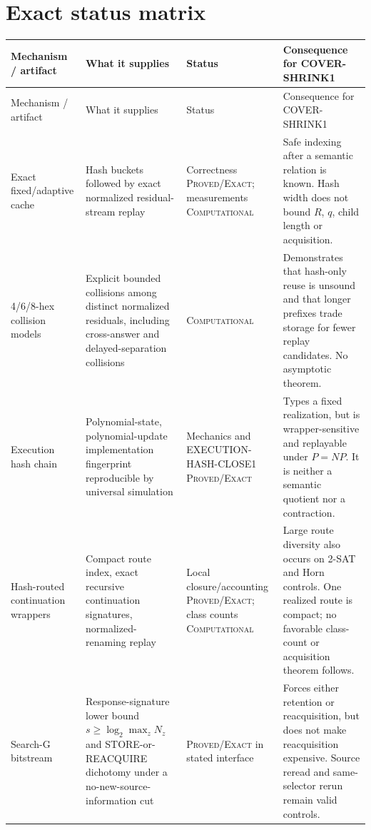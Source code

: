 \documentclass[11pt]{article}
\newcommand{\Exact}{\textsc{Proved/Exact}}
\newcommand{\Comp}{\textsc{Computational}}
\begin{document}
\section{Exact status matrix}

\footnotesize
\begin{longtable}{L{0.16\textwidth}L{0.22\textwidth}L{0.17\textwidth}L{0.33\textwidth}}
\toprule
Mechanism / artifact & What it supplies & Status & Consequence for COVER-SHRINK1 \\
\midrule
\endfirsthead
\toprule
Mechanism / artifact & What it supplies & Status & Consequence for COVER-SHRINK1 \\
\midrule
\endhead
\bottomrule
\endfoot

Exact fixed/adaptive cache & Hash buckets followed by exact normalized residual-stream replay & Correctness \Exact; measurements \Comp & Safe indexing after a semantic relation is known.  Hash width does not bound $R$, $q$, child length or acquisition. \\

4/6/8-hex collision models & Explicit bounded collisions among distinct normalized residuals, including cross-answer and delayed-separation collisions & \Comp & Demonstrates that hash-only reuse is unsound and that longer prefixes trade storage for fewer replay candidates.  No asymptotic theorem. \\

Execution hash chain & Polynomial-state, polynomial-update implementation fingerprint reproducible by universal simulation & Mechanics and EXECUTION-HASH-CLOSE1 \Exact & Types a fixed realization, but is wrapper-sensitive and replayable under $P=NP$.  It is neither a semantic quotient nor a contraction. \\

Hash-routed continuation wrappers & Compact route index, exact recursive continuation signatures, normalized-renaming replay & Local closure/accounting \Exact; class counts \Comp & Large route diversity also occurs on 2-SAT and Horn controls.  One realized route is compact; no favorable class-count or acquisition theorem follows. \\

Search-G bitstream & Response-signature lower bound $s\ge\log_2\max_zN_z$ and STORE-or-REACQUIRE dichotomy under a no-new-source-information cut & \Exact{} in stated interface & Forces either retention or reacquisition, but does not make reacquisition expensive.  Source reread and same-selector rerun remain valid controls. \\


\end{longtable}
\end{document}
